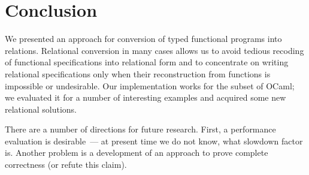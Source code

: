 \section{Conclusion}
\label{conclusion}

We presented an approach for conversion of typed functional programs into relations. Relational conversion 
in many cases allows us to avoid tedious recoding of functional specifications into relational form and to 
concentrate on writing relational specifications only when their reconstruction from functions is impossible or 
undesirable. Our implementation works for the subset of OCaml; we evaluated it for a number of interesting 
examples and acquired some new relational solutions.

There are a number of directions for future research. First, a performance evaluation is desirable~--- at
present time we do not know, what slowdown factor is. Another problem is a development of an approach to
prove complete correctness (or refute this claim).
